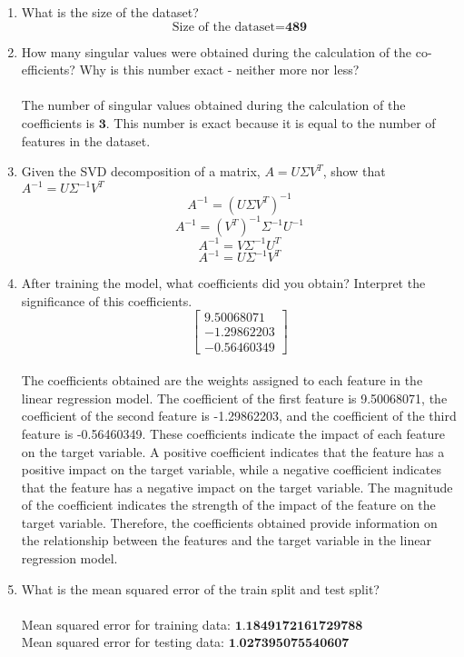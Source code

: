 \documentclass[12pt]{extarticle} %
\begin{document}
\begin{enumerate}
    \item What is the size of the dataset?
    \[
    \text{Size of the dataset} = \textbf{489}
    \]
    \item How many singular values were obtained during the calculation of the co-efficients? Why is this number exact - neither more nor less?
    \\\\ The number of singular values obtained during the calculation of the coefficients is \(\textbf{3}\). This number is exact because it is equal to the number of features in the dataset. 
    \item Given the SVD decomposition of a matrix, \(A = U \Sigma V^T\), show that \(A^{-1} = U\Sigma^{-1}V^T\)
    \[
    A^{-1} = (U \Sigma V^T)^{-1}
    \]
    \[
    A^{-1} = (V^T)^{-1} \Sigma^{-1} U^{-1}
    \]
    \[
    A^{-1} = V \Sigma^{-1} U^T
    \]
    \[
    A^{-1} = U \Sigma^{-1} V^T
    \]
    \item After training the model, what coefficients did you obtain? Interpret the significance of this coefficients.
    \[
        \begin{bmatrix}
            9.50068071 \\
            -1.29862203 \\
            -0.56460349
        \end{bmatrix}
    \] 
    \\ The coefficients obtained are the weights assigned to each feature in the linear regression model. The coefficient of the first feature is 9.50068071, the coefficient of the second feature is -1.29862203, and the coefficient of the third feature is -0.56460349. These coefficients indicate the impact of each feature on the target variable. A positive coefficient indicates that the feature has a positive impact on the target variable, while a negative coefficient indicates that the feature has a negative impact on the target variable. The magnitude of the coefficient indicates the strength of the impact of the feature on the target variable. Therefore, the coefficients obtained provide information on the relationship between the features and the target variable in the linear regression model.
    \item What is the mean squared error of the train split and test split?
    \\\\ Mean squared error for training data:  \(\textbf{1.1849172161729788}\)
    \\ Mean squared error for testing data:  \(\textbf{1.027395075540607}\)


\end{enumerate}
\end{document}
